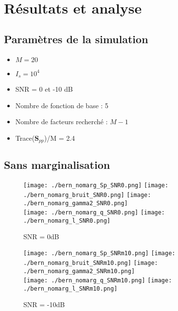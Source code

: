 \documentclass[ 12pt]{article}
\begin{document}
\section{Résultats et analyse}
\subsection{Paramètres de la simulation}

\begin{itemize}
        \item $M=20$
        \item $I_s = 10^4$
        \item SNR = 0 et -10 dB
        \item Nombre de fonction de base : 5
        \item Nombre de facteurs recherché : $M-1$  
        \item Trace($\bm{S}_{pp}$)/M = 2.4     
\end{itemize}


\subsection{Sans marginalisation}

\begin{figure}[H]
\centering
	\texttt{[image: ./bern\_nomarg\_Sp\_SNR0.png]}
	 \texttt{[image: ./bern\_nomarg\_bruit\_SNR0.png]}
	\texttt{[image: ./bern\_nomarg\_gamma2\_SNR0.png]}\\
	\texttt{[image: ./bern\_nomarg\_q\_SNR0.png]}
	\texttt{[image: ./bern\_nomarg\_l\_SNR0.png]}
	\caption{SNR = 0dB}
\end{figure}
\begin{figure}[H]
\centering
	\texttt{[image: ./bern\_nomarg\_Sp\_SNRm10.png]}
	 \texttt{[image: ./bern\_nomarg\_bruit\_SNRm10.png]}
	\texttt{[image: ./bern\_nomarg\_gamma2\_SNRm10.png]}\\
	\texttt{[image: ./bern\_nomarg\_q\_SNRm10.png]}
	\texttt{[image: ./bern\_nomarg\_l\_SNRm10.png]}
	\caption{SNR = -10dB}
\end{figure}

\newpage
\end{document}
